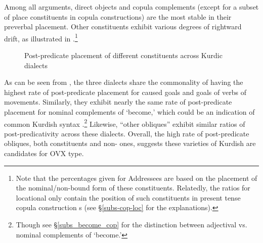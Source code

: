 \documentclass[output=paper,colorlinks,citecolor=brown]{langscibook}
\begin{document}
\begin{sloppypar}
Among all arguments, direct objects and copula complements (except for a subset of place constituents in copula constructions) are the most stable in their preverbal placement. Other constituents exhibit various degrees of rightward drift, as illustrated in .\footnote{Note that the percentages given for Addressees are based on the placement of the nominal/non-bound form of these constituents. Relatedly, the ratios for locational   only contain the position of such constituents in present tense copula construction
s (see §\ref{subs-cop-loc} for the explanations).} 

\begin{figure}
    \ChapterNineFigureOneData
    \caption{Post-predicate placement of different constituents across Kurdic dialects}
    \label{Kurdish:fig:2}
\end{figure}

\largerpage[2]
As can be seen from , the three dialects share the commonality of having the highest rate of post-predicate placement for caused goals and goals of verbs of movements. Similarly, they exhibit nearly the same rate of post-predicate placement for nominal complements of `become,' which could be an indication of common Kurdish syntax \citep[see][342--343 for Northern Kurdish data]{Haig2022PostPredicateCon}.\footnote{Though see §\ref{subs_become_cop} for the distinction between adjectival vs. nominal complements of  `become.'} Likewise, ``other obliques'' exhibit similar ratios of post-predicativity across these dialects. Overall, the high rate of post-predicate obliques, both  constituents and non- ones, suggests these varieties of Kurdish are candidates for  OVX type.


\end{sloppypar}
\end{document}
